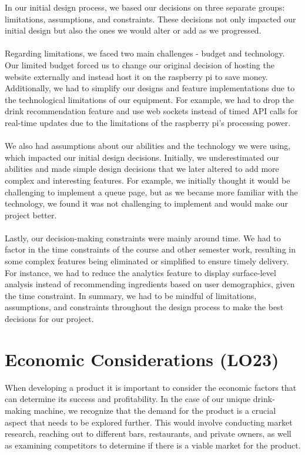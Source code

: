 \documentclass{article}
\begin{document}
In our initial design process, we based our decisions on three separate groups: limitations, assumptions, and constraints. These decisions not only impacted our initial design but also the ones we would alter or add as we progressed.
\\\\
Regarding limitations, we faced two main challenges - budget and technology. Our limited budget forced us to change our original decision of hosting the website externally and instead host it on the raspberry pi to save money. Additionally, we had to simplify our designs and feature implementations due to the technological limitations of our equipment. For example, we had to drop the drink recommendation feature and use web sockets instead of timed API calls for real-time updates due to the limitations of the raspberry pi's processing power.
\\\\
We also had assumptions about our abilities and the technology we were using, which impacted our initial design decisions. Initially, we underestimated our abilities and made simple design decisions that we later altered to add more complex and interesting features. For example, we initially thought it would be challenging to implement a queue page, but as we became more familiar with the technology, we found it was not challenging to implement and would make our project better.
\\\\
Lastly, our decision-making constraints were mainly around time. We had to factor in the time constraints of the course and other semester work, resulting in some complex features being eliminated or simplified to ensure timely delivery. For instance, we had to reduce the analytics feature to display surface-level analysis instead of recommending ingredients based on user demographics, given the time constraint. In summary, we had to be mindful of limitations, assumptions, and constraints throughout the design process to make the best decisions for our project.

\section{Economic Considerations (LO23)}

When developing a product it is important to consider the economic factors that can determine its success and profitability. In the case of our unique drink-making machine, we recognize that the demand for the product is a crucial aspect that needs to be explored further. This would involve conducting market research, reaching out to different bars, restaurants, and private owners, as well as examining competitors to determine if there is a viable market for the product.
\newline
\end{document}
